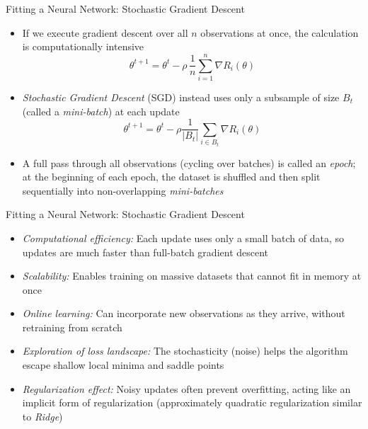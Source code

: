 \documentclass[aspectratio=1610,12pt,xcolor=dvipsnames]{beamer}
\begin{document}
\begin{frame}{Fitting a Neural Network: Stochastic Gradient Descent}
    \begin{itemize}
    \item If we execute gradient descent over all $n$ observations at once, the calculation is computationally intensive
      \[
        \theta^{t+1} = \theta^t - \rho \,\frac{1}{n}\sum_{i=1}^n 
          \nabla R_i(\theta)
      \]
      \item \textit{Stochastic Gradient Descent} (SGD) instead uses only a subsample of size $B_t$ (called a \textit{mini-batch}) at each update
      \[
        \theta^{t+1} = \theta^t -\rho 
          \frac{1}{|B_t|}\sum_{i\in B_t} 
          \nabla R_i(\theta)
      \]
      \item A full pass through all observations (cycling over batches) is called an \textit{epoch}; at the beginning of each epoch, the dataset is shuffled and then split sequentially into non-overlapping \textit{mini-batches}
  \end{itemize}
\end{frame}

\begin{frame}{Fitting a Neural Network: Stochastic Gradient Descent}
  \begin{itemize}
  \item \textit{Computational efficiency:} Each update uses only a small batch of data, so updates are much faster than full-batch gradient descent
  \item \textit{Scalability:} Enables training on massive datasets that cannot fit in memory at once
  \item \textit{Online learning:} Can incorporate new observations as they arrive, without retraining from scratch
  \item \textit{Exploration of loss landscape:} The stochasticity (noise) helps the algorithm escape shallow local minima and saddle points
  \item \textit{Regularization effect:} Noisy updates often prevent overfitting, acting like an implicit form of regularization (approximately quadratic regularization similar to \textit{Ridge})
\end{itemize}
\end{frame}
\end{document}
